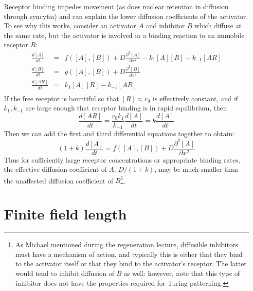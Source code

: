 \documentclass{article}
\begin{document}
Receptor binding impedes movement (as does nuclear retention in diffusion through syncytia) and can explain the lower diffusion coefficients of the activator. To see why this works, consider an activator $A$ and inhibitor $B$ which diffuse at the same rate, but the activator is involved in a binding reaction to an immobile receptor $R$:
\begin{eqnarray*}
\frac{d[A]}{dt} & = & f([A],[B]) + D \frac{\partial^2 [A]}{\partial x^2} - k_1 [A] [R] + k_{-1} [AR]\\
\frac{d[B]}{dt} & = & g([A], [B]) + D \frac{\partial^2 [B]}{\partial x^2}\\
\frac{d[AR]}{dt} & = & k_1 [A] [R] - k_{-1} [AR] \\
\end{eqnarray*}
If the free receptor is bountiful so that $[R]\approx r_0$ is effectively constant, and if $k_1, k_{-1}$ are large enough that receptor binding is in rapid equilibrium, then
\[ \frac{d[AR]}{dt} = \frac{r_0 k_1}{k_{-1}} \frac{d[A]}{dt} = k \frac{d[A]}{dt} \]
Then we can add the first and third differential equations together to obtain:
\[ \left( 1 + k \right) \frac{d[A]}{dt} = f([A],[B]) + D \frac{\partial^2 [A]}{\partial x^2} \]
Thus for sufficiently large receptor concentrations or appropriate binding rates, the effective diffusion coefficient of $A$, $D/(1+k)$, may be much smaller than the unaffected diffusion coefficient of $B$\footnote{As Michael mentioned during the regeneration lecture, diffusible inhibitors must have a mechanism of action, and typically this is either that they bind to the activator itself or that they bind to the activator's receptor.  The latter would tend to inhibit diffusion of $B$ as well: however, note that this type of inhibitor does not have the properties required for Turing patterning.}.

\section*{Finite field length}
\end{document}
